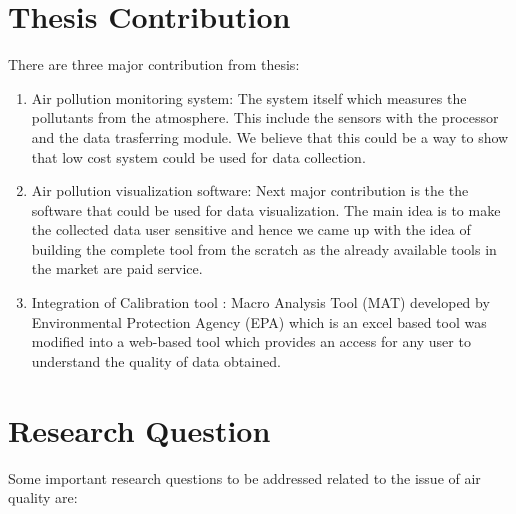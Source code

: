 \section{Thesis Contribution}

There are three major contribution from thesis:
\begin{enumerate}
  
    \item Air pollution monitoring system: The system itself which measures the pollutants from the atmosphere. This include the sensors with the processor and the data trasferring module. We believe that this could be a way to show that low cost system could be used for data collection.
    
    \item  Air pollution visualization software: Next major contribution is the the software that could be used for data visualization. The main idea is to make the collected data user sensitive and hence we came up with the idea of building the complete tool from the scratch as the already available tools in the market are paid service. 
    
    \item Integration of Calibration tool :  Macro Analysis Tool (MAT) developed by Environmental Protection Agency (EPA)\cite{airsensorguidebook} which is an excel based tool was modified into a web-based tool which provides an access for any user to understand the quality of data obtained.
  
\end{enumerate}


\section{Research Question}
 
 Some important research questions to be addressed related to the issue of air quality are: 

